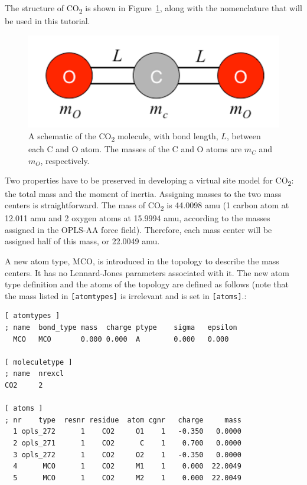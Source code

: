 \documentclass[9pt,tutorial,pubversion]{livecoms}
\begin{document}
The structure of CO\textsubscript{2} is shown in Figure~\ref{vsites_triatomic_fig}, along with the nomenclature that will be used in this tutorial.

\begin{figure}[H]
\centering
\includegraphics{vsites_triatomic}
\caption{A schematic of the CO\textsubscript{2} molecule, with bond length, $L$, between each C and O atom. The masses of the C and O atoms are $m_C$ and $m_O$, respectively.}
\label{vsites_triatomic_fig}
\end{figure}

Two properties have to be preserved in developing a virtual site model for CO\textsubscript{2}: the total mass and the moment of inertia. Assigning masses to the two mass centers is straightforward. The mass of CO\textsubscript{2} is 44.0098 amu (1 carbon atom at 12.011 amu and 2 oxygen atoms at 15.9994 amu, according to the masses assigned in the OPLS-AA force field). Therefore, each mass center will be assigned half of this mass, or 22.0049 amu.

A new atom type, MCO, is introduced in the topology to describe the mass centers. It has no Lennard-Jones parameters associated with it. The new atom type definition and the atoms of the topology are defined as follows (note that the mass listed in \texttt{[atomtypes]} is irrelevant and is set in \texttt{[atoms]}.:

\begin{lstlisting}[basicstyle=\footnotesize\ttfamily]
[ atomtypes ]
; name  bond_type mass  charge ptype    sigma   epsilon
  MCO   MCO       0.000 0.000  A        0.000   0.000

[ moleculetype ]
; name  nrexcl
CO2     2

[ atoms ]
; nr    type  resnr residue  atom cgnr   charge     mass
  1 opls_272      1    CO2     O1    1   -0.350   0.0000 
  2 opls_271      1    CO2      C    1    0.700   0.0000
  3 opls_272      1    CO2     O2    1   -0.350   0.0000
  4      MCO      1    CO2     M1    1    0.000  22.0049     
  5      MCO      1    CO2     M2    1    0.000  22.0049
\end{lstlisting}
\end{document}
